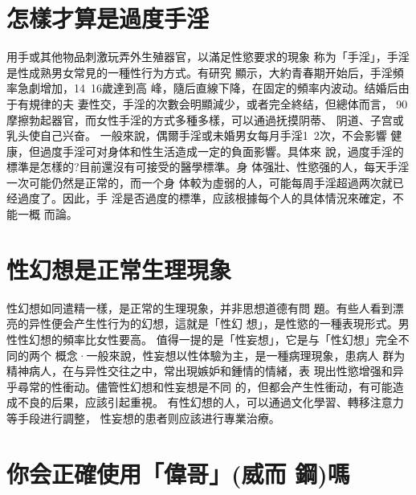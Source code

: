 \documentclass[12pt,UTF8]{ctexbook}
\begin{document}
\section{怎樣才算是過度手淫}

用手或其他物品刺激玩弄外生殖器官，以滿足性慾要求的現象
称为「手淫」，手淫是性成熟男女常見的一種性行为方式。有研究
顯示，大約青春期开始后，手淫頻率急劇增加，14~16歲達到高
峰，隨后直線下降，在固定的頻率内波动。结婚后由于有規律的夫
妻性交，手淫的次數会明顯減少，或者完全終结，但總体而言，
90%
摩擦勃起器官，而女性手淫的方式多種多樣，可以通過抚摸阴蒂、
阴道、子宫或乳头使自己兴奋。
一般來說，偶爾手淫或未婚男女每月手淫1~2次，不会影響
健康，但過度手淫可对身体和性生活造成一定的負面影響。具体來
說，過度手淫的標準是怎樣的?目前還沒有可接受的醫學標準。身
体强壯、性慾强的人，每天手淫一次可能仍然是正常的，而一个身
体較为虛弱的人，可能每周手淫超過两次就已经過度了。因此，手
淫是否過度的標準，应該根據每个人的具体情況來確定，不能一概
而論。
\section{性幻想是正常生理現象}
性幻想如同遣精一樣，是正常的生理現象，并非思想道德有問
題。有些人看到漂亮的异性便会产生性行为的幻想，這就是「性幻
想」，是性慾的一種表現形式。男性性幻想的頻率比女性要高。
值得一提的是「性妄想」，它是与「性幻想」完全不同的两个
概念·一般來說，性妄想以性体驗为主，是一種病理現象，患病人
群为精神病人，在与异性交往之中，常出現嫉妒和鍾情的情緒，表
現出性慾增强和异乎尋常的性衝动。儘管性幻想和性妄想是不同
的，但都会产生性衝动，有可能造成不良的后果，应該引起重視。
有性幻想的人，可以通過文化學習、轉移注意力等手段进行調整，
性妄想的患者则应該进行專業治療。

\section{你会正確使用「偉哥」(威而
鋼)嗎}
\end{document}
